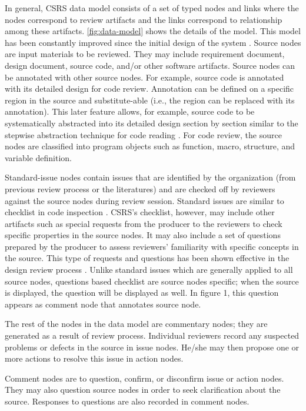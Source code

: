 In general, CSRS data model consists of a set of typed nodes and links
where the nodes correspond to review artifacts and the links
correspond to relationship among these artifacts. \ref{fig:data-model} shows the
details of the model. This model has been constantly improved since the
initial design of the system \cite{csdl-92-02}.
Source nodes are input materials  to be reviewed.  They may include
requirement document, design document, source code, and/or other software
artifacts.
Source nodes can be annotated with other source nodes. For example, source
code is annotated with its detailed design for code review.
Annotation can be defined on a specific region in the source 
and substitute-able (i.e., the region can be
replaced with its annotation).  This later feature allows, for example,
source code to be systematically 
abstracted into its detailed design section by section similar to the
stepwise abstraction technique for code reading \cite{Linger79}.
For code review, the source nodes are classified into
program objects such as function, macro, structure, and variable
definition. 

Standard-issue nodes contain issues that are identified by the
organization (from previous review process or the literatures) and are
checked off by reviewers against the source nodes during review session.
Standard issues are similar to checklist in code inspection
\cite{Fagan76}.  CSRS's checklist, however, may include other artifacts such as
special requests from the producer to the reviewers to check specific
properties in the source nodes. It may also include a set of questions
prepared by the producer 
to assess reviewers' familiarity with specific concepts in the source.
This type of requests and questions  has been shown effective in
the design review process \cite{Parnas85}.  
Unlike standard issues which are generally  applied to
all source nodes, questions based checklist are source
nodes specific; when the source is displayed, the question
will be displayed as well.  In figure 1,
this question appears as comment node that annotates source node.


The rest of the nodes in the data model are commentary nodes; they are
generated as a result of review process. Individual reviewers record
any suspected problems or defects in the source in issue nodes.
He/she may then propose one or more actions to resolve this issue in
action nodes. 

Comment nodes are to question, confirm, or disconfirm  issue or action
nodes. They may also question source nodes in order to seek
clarification about the source. Responses to questions are
also recorded in comment nodes. 


